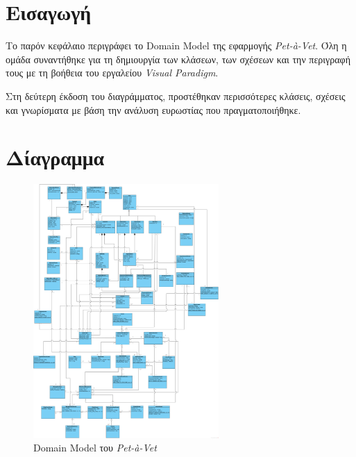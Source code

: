 \documentclass[12pt,a4paper,twoside]{book}
\begin{document}
\section{Εισαγωγή}
Το παρόν κεφάλαιο περιγράφει το Domain Model της εφαρμογής \textit{Pet-à-Vet}. Όλη η ομάδα συναντήθηκε για τη δημιουργία των κλάσεων, των σχέσεων και την περιγραφή τους με τη βοήθεια του εργαλείου \textit{Visual Paradigm}. %

Στη δεύτερη έκδοση του διαγράμματος, προστέθηκαν περισσότερες κλάσεις, σχέσεις και γνωρίσματα με βάση την ανάλυση ευρωστίας που πραγματοποιήθηκε. %

\section{Δίαγραμμα}
\begin{figure}[H]
    \centering
    \includegraphics[width=0.63\textwidth]{Resources/Domain-model-v0.2.png}
    \caption{Domain Model του \textit{Pet-à-Vet}}\label{fig:domain_model}
\end{figure}
\end{document}
